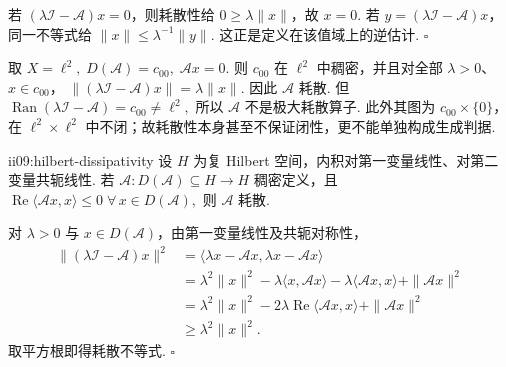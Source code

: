 \begin{FAProof}
若 \(\displaystyle(\lambda\mathcal I-\mathcal A)x=0\)，则耗散性给 \(\displaystyle0\geqslant\lambda\|x\|\)，故 \(\displaystyle x=0\). 若 \(\displaystyle y=(\lambda\mathcal I-\mathcal A)x\)，同一不等式给 \(\displaystyle \|x\| \leqslant \lambda^{-1}\|y\|.\)
这正是定义在该值域上的逆估计.
\hfill\(\square\)
\end{FAProof}

\begin{FACounterexample}[耗散不推出极大耗散]\label{ii09:ce-dissip-not-max}
取 \(\displaystyle X=\ell^2, \; D(\mathcal A)=c_{00}, \; \mathcal Ax=0.\)
则 \(\displaystyle c_{00}\) 在 \(\displaystyle\ell^2\) 中稠密，并且对全部 \(\displaystyle\lambda>0\)、\(\displaystyle x\in c_{00}\)， \(\displaystyle \|(\lambda\mathcal I-\mathcal A)x\| = \lambda\|x\|.\)
因此 \(\displaystyle\mathcal A\) 耗散. 但 \(\displaystyle \operatorname{Ran}(\lambda\mathcal I-\mathcal A) = c_{00} \neq \ell^2,\)
所以 \(\displaystyle\mathcal A\) 不是极大耗散算子. 此外其图为 \(\displaystyle c_{00}\times\{0\}\)，在 \(\displaystyle\ell^2\times\ell^2\) 中不闭；故耗散性本身甚至不保证闭性，更不能单独构成生成判据.
\end{FACounterexample}

\begin{FAProposition}{ii09:hilbert-dissipativity}
设 \(\displaystyle H\) 为复 Hilbert 空间，内积对第一变量线性、对第二变量共轭线性. 若 \(\displaystyle \mathcal A:D(\mathcal A)\subseteq H\to H\)
稠密定义，且 \(\displaystyle \operatorname{Re}\langle\mathcal Ax,x\rangle \leqslant0 \; \forall\,x\in D(\mathcal A),\)
则 \(\displaystyle\mathcal A\) 耗散.
\end{FAProposition}

\begin{FAProof}
对 \(\displaystyle\lambda>0\) 与 \(\displaystyle x\in D(\mathcal A)\)，由第一变量线性及共轭对称性，
\[
\begin{aligned}
\|(\lambda\mathcal I-\mathcal A)x\|^2
&=
\langle\lambda x-\mathcal Ax,\lambda x-\mathcal Ax\rangle\\
&=
\lambda^2\|x\|^2
-\lambda\langle x,\mathcal Ax\rangle
-\lambda\langle\mathcal Ax,x\rangle
+\|\mathcal Ax\|^2\\
&=
\lambda^2\|x\|^2
-2\lambda\operatorname{Re}\langle\mathcal Ax,x\rangle
+\|\mathcal Ax\|^2\\
&\geqslant
\lambda^2\|x\|^2.
\end{aligned}
\]
取平方根即得耗散不等式.
\hfill\(\square\)
\end{FAProof}

